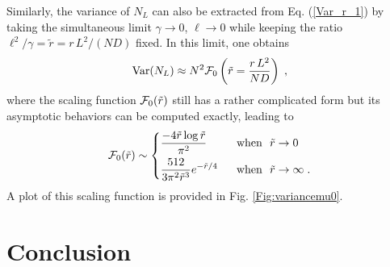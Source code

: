 \documentclass[onecolumn,superscriptaddress,
 amsmath,amssymb,
 aps,
 prd,
]{revtex4-1}
\newcommand{\bea}{\begin{eqnarray}}
\newcommand{\eea}{\end{eqnarray}}
\begin{document}
\vspace*{0.3cm}
Similarly, the variance of $N_L$ can also be extracted from Eq. (\ref{Var_r_1}) by taking the simultaneous limit $\gamma \to 0$, $\ell \to 0$ while keeping the  ratio $\ell^2/\gamma = \tilde r = r\,L^2/(N D)$ fixed. In this limit, one obtains
\bea \label{var_mu0}
{\rm Var}(N_L) \approx N^2 {\cal F}_0\left(\tilde r = \frac{r\, L^2}{N D}\right) \;,
\eea
where the scaling function ${\cal F}_0(\tilde r)$ still has a rather complicated form but its asymptotic behaviors can be computed exactly, leading to 
\begin{equation}
\mathcal{F}_0(\tilde r) \sim \begin{dcases}
 \frac{-4 \tilde r \log \tilde r}{\pi^2} &\mbox{~~when~~} \tilde r \to 0 \\
\frac{512}{3 \pi^2 \tilde r^3} e^{-\tilde r/4} &\mbox{~~when~~} \tilde r \to \infty \;.
\end{dcases}
\end{equation}
A plot of this scaling function is provided in Fig. \ref{Fig:variancemu0}.


\section{Conclusion} \label{sec:conclusion}
\end{document}

